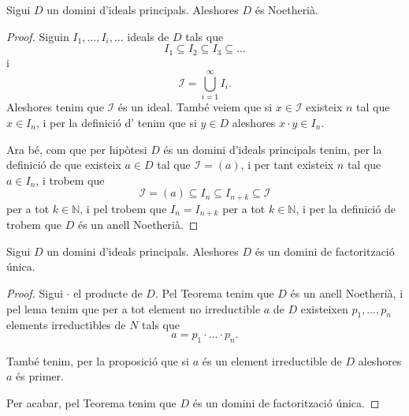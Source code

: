 \documentclass[../Apunts.tex]{subfiles}
\begin{document}
	\begin{theorem}
		\label{thm:DIP es Noetherià}
		Sigui \(D\) un domini d'ideals principals. Aleshores \(D\) és Noetherià.
		\begin{proof}
			Siguin \(I_{1},\dots,I_{i},\dots\) ideals de \(D\) tals que
			\[I_{1}\subseteq I_{2}\subseteq I_{3}\subseteq\dots\]
			i
			\[\mathcal{I}=\bigcup_{i=1}^{\infty}I_{i}.\]
			Aleshores tenim que \(\mathcal{I}\) és un ideal. També veiem que si \(x\in\mathcal{I}\) existeix \(n\) tal que \(x\in I_{n}\), i per la definició d' tenim que si \(y\in D\) aleshores \(x\cdot y\in I_{n}\).
			
			Ara bé, com que per hipòtesi \(D\) és un domini d'ideals principals tenim, per la definició de  que existeix \(a\in D\) tal que \(\mathcal{I}=(a)\), i per tant existeix \(n\) tal que \(a\in I_{n}\), i trobem que
			\[\mathcal{I}=(a)\subseteq I_{n}\subseteq I_{n+k}\subseteq\mathcal{I}\]
			per a tot \(k\in\mathbb{N}\), i pel  trobem que \(I_{n}=I_{n+k}\) per a tot \(k\in\mathbb{N}\), i per la definició de  trobem que \(D\) és un anell Noetherià.
		\end{proof}
	\end{theorem}
	\begin{theorem}
		\label{thm:DIP és DFU}
		Sigui \(D\) un domini d'ideals principals. Aleshores \(D\) és un domini de factorització única.
		\begin{proof}
			Sigui \(\cdot\) el producte de \(D\). Pel Teorema  tenim que \(D\) és un anell Noetherià, i pel lema  tenim que per a tot element no irreductible \(a\) de \(D\) existeixen \(p_{1},\dots,p_{n}\) elements irreductibles de \(N\) tals que
			\[a=p_{1}\cdot\ldots\cdot p_{n}.\]
			
			També tenim, per la proposició  que si \(a\) és un element irreductible de \(D\) aleshores \(a\) és primer.
			
			Per acabar, pel Teorema  tenim que \(D\) és un domini de factorització única.
		\end{proof}
	\end{theorem}
\end{document}
